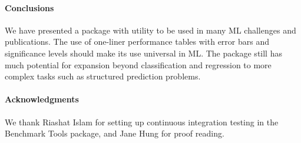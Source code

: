 \documentclass{article}
\newcommand{\sectionx}{\paragraph}
\begin{document}
\sectionx{Conclusions}
We have presented a package with utility to be used in many ML challenges and publications.
The use of one-liner performance tables with error bars and significance levels should make its use universal in ML\@.
The package still has much potential for expansion beyond classification and regression to more complex tasks such as structured prediction problems.

\paragraph{Acknowledgments}
We thank Riashat Islam for setting up continuous integration testing in the Benchmark Tools package, and Jane Hung for proof reading.


\end{document}
